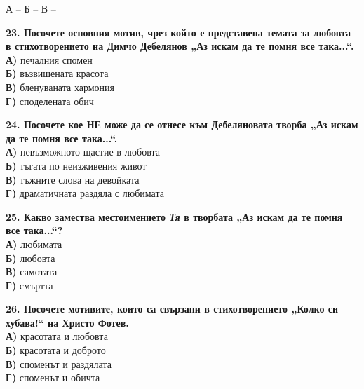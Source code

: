 \documentclass[12pt,a4paper]{article}
\begin{document}
\vspace{0.3cm}
\noindent
А -- \makebox[1cm]{\dotfill} \hspace{0.5cm} Б -- \makebox[1cm]{\dotfill} \hspace{0.5cm} В -- \makebox[1cm]{\dotfill}

\vspace{0.6cm}

\noindent
\textbf{23. Посочете основния мотив, чрез който е представена темата за любовта в стихотворението на Димчо Дебелянов „Аз искам да те помня все така...“.} \\
\noindent
\textbf{А)} печалния спомен \\
\textbf{Б)} възвишената красота \\
\textbf{В)} бленуваната хармония \\
\textbf{Г)} споделената обич

\vspace{0.6cm}

\noindent
\textbf{24. Посочете кое НЕ може да се отнесе към Дебеляновата творба „Аз искам да те помня все така...“.} \\
\noindent
\textbf{А)} невъзможното щастие в любовта \\
\textbf{Б)} тъгата по неизживения живот \\
\textbf{В)} тъжните слова на девойката \\
\textbf{Г)} драматичната раздяла с любимата

\vspace{0.6cm}

\noindent
\textbf{25. Какво замества местоимението \textit{Тя} в творбата „Аз искам да те помня все така...“?} \\
\noindent
\textbf{А)} любимата \\
\textbf{Б)} любовта \\
\textbf{В)} самотата \\
\textbf{Г)} смъртта

\vspace{0.6cm}

\noindent
\textbf{26. Посочете мотивите, които са свързани в стихотворението „Колко си хубава!“ на Христо Фотев.} \\
\noindent
\textbf{А)} красотата и любовта \\
\textbf{Б)} красотата и доброто \\
\textbf{В)} споменът и раздялата \\
\textbf{Г)} споменът и обичта

\vspace{0.6cm}
\end{document}
